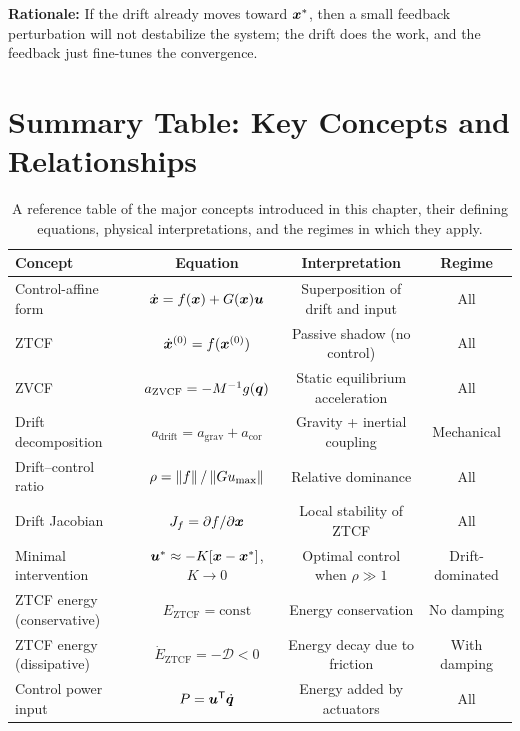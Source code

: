 \noindent\textbf{Rationale:} If the drift already moves toward $\bm{x}^*$, then a small feedback
perturbation will not destabilize the system; the drift does the work, and the feedback just
fine-tunes the convergence.

\section{Summary Table: Key Concepts and Relationships}

\begin{table}[h!]
\centering
\small
\begin{tabular}{|l|c|c|c|}
\hline
\textbf{Concept} & \textbf{Equation} & \textbf{Interpretation} & \textbf{Regime} \\
\hline
Control-affine form & $\dot{\bm{x}} = f(\bm{x}) + G(\bm{x})\bm{u}$ & Superposition of drift and input & All \\
\hline
ZTCF & $\dot{\bm{x}}^{(0)} = f(\bm{x}^{(0)})$ & Passive shadow (no control) & All \\
\hline
ZVCF & $a_{\text{ZVCF}} = -M^{-1}g(\bm{q})$ & Static equilibrium acceleration & All \\
\hline
Drift decomposition & $a_{\text{drift}} = a_{\text{grav}} + a_{\text{cor}}$ & Gravity + inertial coupling & Mechanical \\
\hline
Drift--control ratio & $\rho = \left\lVert f \right\rVert/\left\lVert G u_{\max} \right\rVert$ & Relative dominance & All \\
\hline
Drift Jacobian & $J_f = \partial f/\partial\bm{x}$ & Local stability of ZTCF & All \\
\hline
Minimal intervention & $\bm{u}^* \approx -K[\bm{x}-\bm{x}^*]$, $K\to 0$ & Optimal control when $\rho\gg 1$ & Drift-dominated \\
\hline
ZTCF energy (conservative) & $E_{\text{ZTCF}} = \text{const}$ & Energy conservation & No damping \\
\hline
ZTCF energy (dissipative) & $\dot{E}_{\text{ZTCF}} = -\mathcal{D} < 0$ & Energy decay due to friction & With damping \\
\hline
Control power input & $P = \bm{u}^{\mathsf{T}}\dot{\bm{q}}$ & Energy added by actuators & All \\
\hline
\end{tabular}
\caption[Summary of counterfactual concepts and their key relationships.]
{A reference table of the major concepts introduced in this chapter, their defining equations,
physical interpretations, and the regimes in which they apply.}
\label{tab:ch7:summary}
\end{table}

